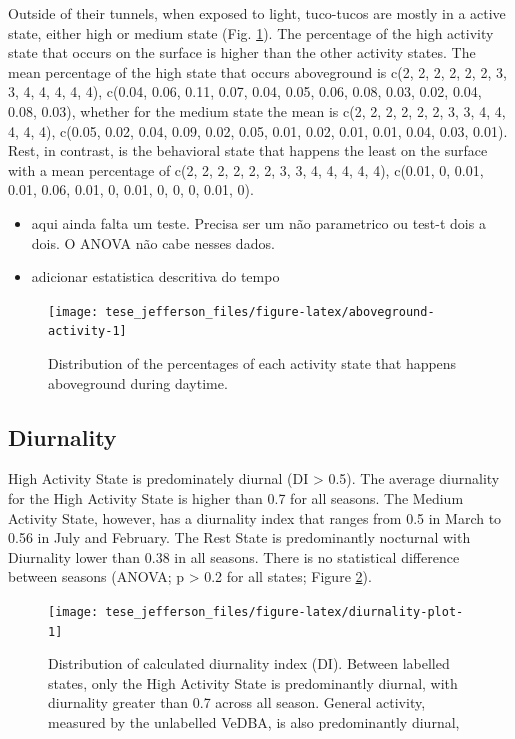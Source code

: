 \documentclass[english,msc,numbers,hidelinks]{coppe}
\providecommand{\tightlist}{%
  \setlength{\itemsep}{0pt}\setlength{\parskip}{0pt}}
\begin{document}
  Outside of their tunnels, when exposed to light, tuco-tucos are mostly in a active state, either high or medium state (Fig. \ref{fig:aboveground-activity}). The percentage of the high activity state that occurs on the surface is higher than the other activity states. The mean percentage of the high state that occurs aboveground is c(2, 2, 2, 2, 2, 2, 3, 3, 4, 4, 4, 4, 4), c(0.04, 0.06, 0.11, 0.07, 0.04, 0.05, 0.06, 0.08, 0.03, 0.02, 0.04, 0.08, 0.03), whether for the medium state the mean is c(2, 2, 2, 2, 2, 2, 3, 3, 4, 4, 4, 4, 4), c(0.05, 0.02, 0.04, 0.09, 0.02, 0.05, 0.01, 0.02, 0.01, 0.01, 0.04, 0.03, 0.01). Rest, in contrast, is the behavioral state that happens the least on the surface with a mean percentage of c(2, 2, 2, 2, 2, 2, 3, 3, 4, 4, 4, 4, 4), c(0.01, 0, 0.01, 0.01, 0.06, 0.01, 0, 0.01, 0, 0, 0, 0.01, 0).\newline
  \begin{itemize}
  \tightlist
  \item
    aqui ainda falta um teste. Precisa ser um não parametrico ou test-t dois a dois. O ANOVA não cabe nesses dados.
  \item
    adicionar estatistica descritiva do tempo
  \end{itemize}
  \begin{figure}[H]

  {\centering \texttt{[image: tese\_jefferson\_files/figure-latex/aboveground-activity-1]} 

  }

  \caption{Distribution of the percentages of each activity state that happens aboveground during daytime.}\label{fig:aboveground-activity}
  \end{figure}
  \newpage

  \hypertarget{diurnality}{%
  \subsection{Diurnality}\label{diurnality}}

  High Activity State is predominately diurnal (DI \textgreater{} 0.5). The average diurnality for the High Activity State is higher than 0.7 for all seasons. The Medium Activity State, however, has a diurnality index that ranges from 0.5 in March to 0.56 in July and February. The Rest State is predominantly nocturnal with Diurnality lower than 0.38 in all seasons. There is no statistical difference between seasons (ANOVA; p \textgreater{} 0.2 for all states; Figure \ref{fig:diurnality-plot}). \newline
  \begin{figure}[H]

  {\centering \texttt{[image: tese\_jefferson\_files/figure-latex/diurnality-plot-1]} 

  }

  \caption{Distribution of calculated diurnality index (DI). Between labelled states, only the High Activity State is predominantly diurnal, with diurnality greater than 0.7 across all season. General activity, measured by the unlabelled VeDBA, is also predominantly diurnal, }\label{fig:diurnality-plot}
  \end{figure}
  \newpage
\end{document}
